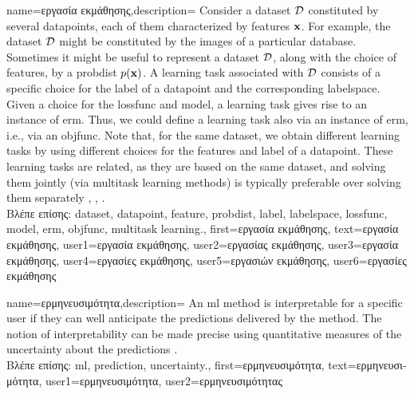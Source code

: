 {name={\foreignlanguage{greek}{εργασία εκμάθησης}},description=
	{Consider a \gls{dataset} $\mathcal{D}$ constituted by several \gls{datapoint}s, each of them 
	 characterized by \gls{feature}s ${\bf x}$. For example, the \gls{dataset} $\mathcal{D}$ 
	 might be constituted by the images of a particular database. Sometimes it might be useful 
	 to represent a \gls{dataset} $\mathcal{D}$, along with the choice of \gls{feature}s, by a \gls{probdist} $p({\bf x})$. 
	 A learning task associated with $\mathcal{D}$ consists of a specific 
	 choice for the \gls{label} of a \gls{datapoint} and the corresponding \gls{labelspace}. 
	 Given a choice for the \gls{lossfunc} and \gls{model}, a learning task gives rise to an 
	 instance of \gls{erm}. Thus, we could define a learning task also via an instance of \gls{erm}, i.e., 
	 via an \gls{objfunc}. Note that, for the same \gls{dataset}, we obtain different learning tasks by using 
	 different choices for the \gls{feature}s and \gls{label} of a \gls{datapoint}. These learning 
	 tasks are related, as they are based on the same \gls{dataset}, and solving them jointly 
	 (via \gls{multitask learning} methods) is typically preferable over solving them separately \cite{Caruana:1997wk}, \cite{JungGaphLassoSPL}, \cite{CSGraphSelJournal}.\\
	 \foreignlanguage{greek}{Βλέπε επίσης:} \gls{dataset}, \gls{datapoint}, \gls{feature}, \gls{probdist}, \gls{label}, \gls{labelspace}, \gls{lossfunc}, \gls{model}, \gls{erm}, \gls{objfunc}, \gls{multitask learning}.},
	first={\foreignlanguage{greek}{εργασία εκμάθησης}},
	text={\foreignlanguage{greek}{εργασία εκμάθησης}},
	user1={\foreignlanguage{greek}{εργασία εκμάθησης}}, %
	user2={\foreignlanguage{greek}{εργασίας εκμάθησης}}, %
	user3={\foreignlanguage{greek}{εργασία εκμάθησης}}, %
	user4={\foreignlanguage{greek}{εργασίες εκμάθησης}}, %
	user5={\foreignlanguage{greek}{εργασιών εκμάθησης}}, %
	user6={\foreignlanguage{greek}{εργασίες εκμάθησης}} %
}

{name={\foreignlanguage{greek}{ερμηνευσιμότητα}},description=
		{An \gls{ml} method is interpretable for a specific user if 
			they can well anticipate the \gls{prediction}s delivered by the method. 
			The notion of interpretability can be made precise using quantitative 
			measures of the \gls{uncertainty} about the \gls{prediction}s \cite{JunXML2020}.\\
			\foreignlanguage{greek}{Βλέπε επίσης:} \gls{ml}, \gls{prediction}, \gls{uncertainty}.},
		first={\foreignlanguage{greek}{ερμηνευσιμότητα}},
		text={\foreignlanguage{greek}{ερμηνευσιμότητα}},
		user1={\foreignlanguage{greek}{ερμηνευσιμότητα}}, %
		user2={\foreignlanguage{greek}{ερμηνευσιμότητας}} %
}

